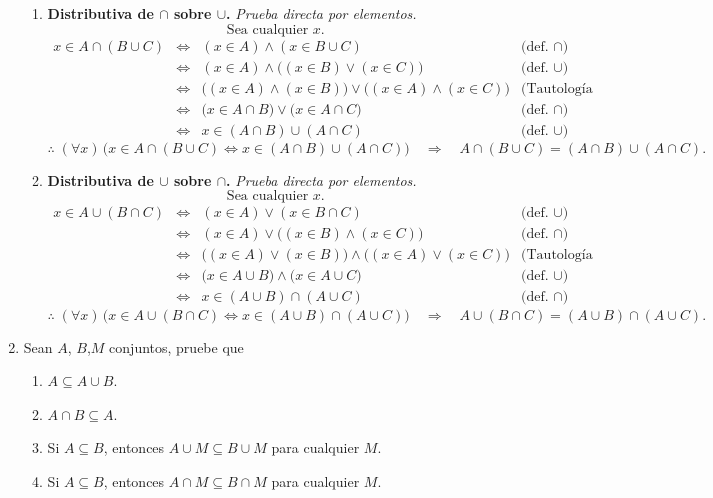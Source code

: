 \documentclass[12pt,letterpaper]{exam}
\begin{document}
\begin{enumerate}
\begin{enumerate}[label=\alph*)]
\item \textbf{Distributiva de $\cap$ sobre $\cup$.} \; \textit{Prueba directa por elementos.}
\[
\text{Sea cualquier } x.
\]
\[
\begin{array}{rcll}
x \in A \cap (B \cup C)
&\iff& (x\in A)\land(x\in B\cup C) & \text{(def.\ $\cap$)}\\[2pt]
&\iff& (x\in A)\land\big((x\in B)\lor(x\in C)\big) & \text{(def.\ $\cup$)}\\[2pt]
&\iff& \big((x\in A)\land(x\in B)\big)\lor\big((x\in A)\land(x\in C)\big) & \text{(Tautología No. 9)}\\[2pt]
&\iff& \big(x\in A\cap B\big)\lor\big(x\in A\cap C\big) & \text{(def.\ $\cap$)}\\[2pt]
&\iff& x \in (A\cap B)\cup(A\cap C) & \text{(def.\ $\cup$)}
\end{array}
\]
\[
\therefore\; (\forall x)\,\big(x\in A\cap(B\cup C)\iff x\in (A\cap B)\cup(A\cap C)\big)
\quad\Rightarrow\quad
A\cap(B\cup C)=(A\cap B)\cup(A\cap C).
\]

\item \textbf{Distributiva de $\cup$ sobre $\cap$.} \; \textit{Prueba directa por elementos.}
\[
\text{Sea cualquier } x.
\]
\[
\begin{array}{rcll}
x \in A \cup (B \cap C)
&\iff& (x\in A)\lor(x\in B\cap C) & \text{(def.\ $\cup$)}\\[2pt]
&\iff& (x\in A)\lor\big((x\in B)\land(x\in C)\big) & \text{(def.\ $\cap$)}\\[2pt]
&\iff& \big((x\in A)\lor(x\in B)\big)\land\big((x\in A)\lor(x\in C)\big) & \text{(Tautología No. 8)}\\[2pt]
&\iff& \big(x\in A\cup B\big)\land\big(x\in A\cup C\big) & \text{(def.\ $\cup$)}\\[2pt]
&\iff& x \in (A\cup B)\cap(A\cup C) & \text{(def.\ $\cap$)}
\end{array}
\]
\[
\therefore\; (\forall x)\,\big(x\in A\cup(B\cap C)\iff x\in (A\cup B)\cap(A\cup C)\big)
\quad\Rightarrow\quad
A\cup(B\cap C)=(A\cup B)\cap(A\cup C).
\]

\end{enumerate}

    

    \item  Sean $A$, $B$,$M$ conjuntos, pruebe que
    \begin{enumerate}[label=\alph*)]
        \item \(A \subseteq A \cup B\).
        \item \(A \cap B \subseteq A\).
        \item Si \(A \subseteq B\), entonces \(A \cup M \subseteq B \cup M\) para cualquier \(M\).
        \item Si \(A \subseteq B\), entonces \(A \cap M \subseteq B \cap M\) para cualquier \(M\).
    \end{enumerate}


\end{enumerate}
\end{document}
